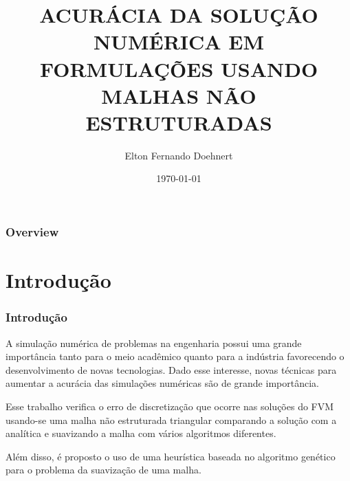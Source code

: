 \documentclass{beamer}
\title[Acurácia Numérica]{ACURÁCIA DA SOLUÇÃO NUMÉRICA EM FORMULAÇÕES USANDO MALHAS NÃO
ESTRUTURADAS} %
\author{Elton Fernando Doehnert} %
\institute[UFPR] %
{
Universidade Federal do Paraná \\ %
\medskip
\textit{eltonfd@gmail.com} %
}
\date{\today} %
\begin{document}
\begin{frame}
  \titlepage %
\end{frame}

\begin{frame}
  \frametitle{Overview} %
  \tableofcontents %
\end{frame}


\section{Introdução}
\begin{frame}
  \frametitle{Introdução}
  A simulação numérica de problemas na engenharia possui uma grande importância tanto para o meio acadêmico quanto para a indústria favorecendo o desenvolvimento de novas tecnologias. Dado esse interesse, novas técnicas para aumentar a acurácia das simulações numéricas são de grande importância.

  Esse trabalho verifica o erro de discretização que ocorre nas soluções do FVM usando-se uma malha não estruturada triangular comparando a solução com a analítica e suavizando a malha com vários algoritmos diferentes.

  Além disso, é proposto o uso de uma heurística baseada no algoritmo genético para o problema da suavização de uma malha.
\end{frame}
\end{document}
